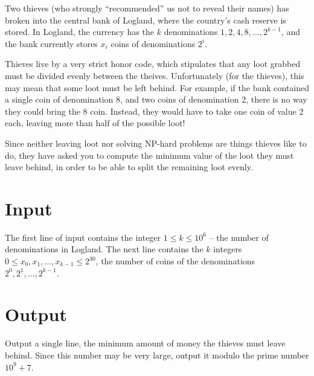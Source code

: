 Two thieves (who strongly ``recommended'' us not to reveal their names) has broken into the central bank of Logland, where the country's cash reserve is stored.
In Logland, the currency has the $k$ denominations $1, 2, 4, 8, ..., 2^{k - 1}$, and the bank currently stores $x_i$ coins of denominations $2^i$.

Thieves live by a very strict honor code, which stipulates that any loot grabbed must be divided evenly between the theives.
Unfortunately (for the thieves), this may mean that some loot must be left behind.
For example, if the bank contained a single coin of denomination 8, and two coins of denomination 2, there is no way they could bring the 8 coin.
Instead, they would have to take one coin of value 2 each, leaving more than half of the possible loot!

Since neither leaving loot nor solving NP-hard problems are things thieves like to do, they have asked you to compute the minimum value of the loot they must leave behind, in order to be able to
split the remaining loot evenly.

\section*{Input}
The first line of input contains the integer $1 \le k \le 10^6$ -- the number of denominations in Logland.
The next line contains the $k$ integers $0 \le x_0, x_1, \dots, x_{k-1} \le 2^{30}$, the number of coins of the denominations $2^0, 2^1, \dots, 2^{k - 1}$.

\section*{Output}
Output a single line, the minimum amount of money the thieves must leave behind.
Since this number may be very large, output it modulo the prime number $10^9 + 7$.
